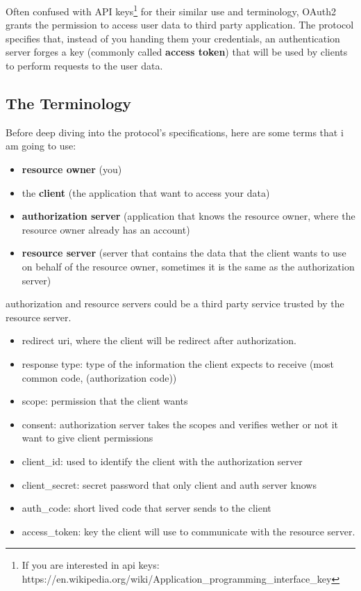 \documentclass[20pt]{style}
\begin{document}
Often confused with API
keys\footnote{If you are interested in api keys: https://en.wikipedia.org/wiki/Application\_programming\_interface\_key}
for their similar use and terminology, OAuth2 grants the permission to access
user data to third party application.
The protocol specifies that, instead of you handing them your credentials, an
authentication server forges a key (commonly called \textbf{access token}) that
will be used by clients to perform requests to the user data.

\subsection{The Terminology}
Before deep diving into the protocol's specifications, here are some terms that
i am going to use:

\begin{itemize}
    \item \textbf{resource owner} (you)
    \item the \textbf{client} (the application that want to access your data)
    \item \textbf{authorization server} (application that knows the resource owner, where
        the resource owner already has an account)
    \item \textbf{resource server} (server that contains the data that the client wants
        to use on behalf of the resource owner, sometimes it is the same as the
        authorization server)
\end{itemize}

authorization and resource servers could be a third party service trusted by the
resource server.

\begin{itemize}
    \item  redirect uri, where the client will be redirect after authorization.
    \item  response type: type of the information the client expects to receive
        (most common code, (authorization code))
    \item  scope: permission that the client wants
    \item  consent: authorization server takes the scopes and verifies wether or not
        it want to give client permissions
    \item  client\_id: used to identify the client with the authorization server
    \item  client\_secret: secret password that only client and auth server knows
    \item  auth\_code: short lived code that server sends to the client
    \item access\_token: key the client will use to communicate with the resource server.
\end{itemize}
\end{document}
